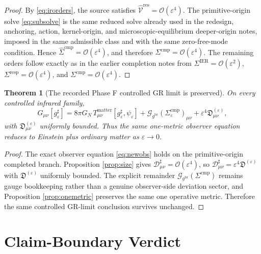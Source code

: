 \documentclass[11pt]{article}
\newcommand{\ObserverMetric}{g^{\mathrm{br}}}
\newcommand{\CompletedMetric}{g^{\sharp}}
\newcommand{\BaseShift}{\Sigma^{\mathrm{IER}}}
\newcommand{\ResponseShift}{\Sigma^{\mathrm{resp}}}
\newcommand{\CompShift}{\Sigma^{\mathrm{cmp}}}
\newcommand{\CompLift}{\widehat\Sigma^{\mathrm{cmp}}}
\newcommand{\ResidualLift}{\widehat{\mathcal V}^{\mathrm{res}}}
\newcommand{\GaugeBook}{\mathcal G_{\ObserverMetric}}
\newcommand{\CompDec}{\mathcal D_{\mu\nu}^{\sharp}}
\newcommand{\epsIR}{\varepsilon}
\newtheorem{theorem}{Theorem}
\begin{document}
\begin{proof}
By \eqref{eq:irorders}, the source satisfies \(\ResidualLift=\mathcal O(\epsIR^4)\). The primitive-origin solve \eqref{eq:subsolve} is the same reduced solve already used in the redesign, anchoring, action, kernel-origin, and microscopic-equilibrium deeper-origin notes, imposed in the same admissible class and with the same zero-free-mode condition. Hence \(\CompLift=\mathcal O(\epsIR^4)\), and therefore \(\CompShift=\mathcal O(\epsIR^4)\). The remaining orders follow exactly as in the earlier completion notes from \(\BaseShift=\mathcal O(\epsIR^2)\), \(\ResponseShift=\mathcal O(\epsIR^4)\), and \(\CompShift=\mathcal O(\epsIR^4)\).
\end{proof}

\begin{theorem}[The recorded Phase F controlled GR limit is preserved]
\label{thm:phaseF}
On every controlled infrared family,
\begin{equation}
G_{\mu\nu}[\CompletedMetric_{\epsIR}]
=
8\pi G_N\,T_{\mu\nu}^{\mathrm{matter}}[\CompletedMetric_{\epsIR},\psi_{\epsIR}]
+\GaugeBook(\CompShift_{\epsIR})_{\mu\nu}
+\epsIR^4\mathfrak D_{\mu\nu}^{(\epsIR)},
\label{eq:phaseFnew}
\end{equation}
with \(\mathfrak D_{\mu\nu}^{(\epsIR)}\) uniformly bounded. Thus the same one-metric observer equation reduces to Einstein plus ordinary matter as \(\epsIR\to 0\).
\end{theorem}

\begin{proof}
The exact observer equation \eqref{eq:newobs} holds on the primitive-origin completed branch. Proposition \ref{prop:size} gives \(\CompDec=\mathcal O(\epsIR^4)\), so \(\CompDec=\epsIR^4\mathfrak D^{(\epsIR)}\) with \(\mathfrak D^{(\epsIR)}\) uniformly bounded. The explicit remainder \(\GaugeBook(\CompShift)\) remains gauge bookkeeping rather than a genuine observer-side deviation sector, and Proposition \ref{prop:onemetric} preserves the same one operative metric. Therefore the same controlled GR-limit conclusion survives unchanged.
\end{proof}

\section{Claim-Boundary Verdict}
\end{document}
